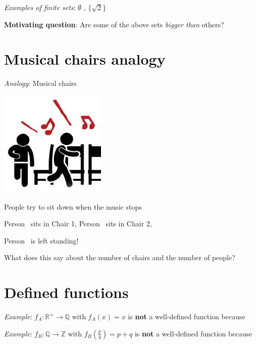 \documentclass[12pt, oneside]{article}
\begin{document}
    {\it Examples of finite sets}: $\emptyset$ , $\{ \sqrt{2} \}$
    
    
    {\bf Motivating question}: Are some of the above sets {\it bigger than} others? \vfill
\section*{Musical chairs analogy}


{\it Analogy}: Musical chairs

\begin{multicols}{2}
\includegraphics[width=2in]{../../resources/images/musicalChairs.png}
\columnbreak

People try to sit down when the music stops

Person\sun~ sits in Chair 1,
Person\smiley~ sits in Chair 2,

Person\frownie~  is left standing!
\end{multicols}
What does this say about the number of chairs and the number of people? \vfill
\section*{Defined functions}




{\it Example}: $f_A: \mathbb{R}^+ \to \mathbb{Q}$ with $f_A(x) = x$ is {\bf not} a well-defined function because

\vfill


{\it Example}: $f_B: \mathbb{Q} \to \mathbb{Z}$ with $f_B\left(\frac{p}{q}\right) = p+q$ is {\bf not} a well-defined function because
\end{document}
